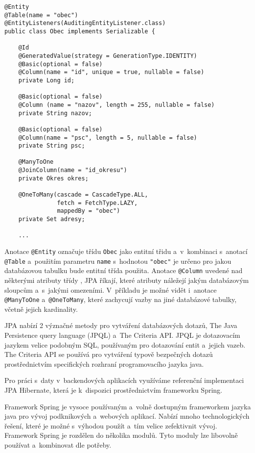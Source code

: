 \documentclass[12pt]{article}
\begin{document}
{\begin{lstlisting}
@Entity
@Table(name = "obec")
@EntityListeners(AuditingEntityListener.class)
public class Obec implements Serializable {

    @Id
    @GeneratedValue(strategy = GenerationType.IDENTITY)
    @Basic(optional = false)
    @Column(name = "id", unique = true, nullable = false)
    private Long id;
    
    @Basic(optional = false)
    @Column (name = "nazov", length = 255, nullable = false)
    private String nazov;
     
    @Basic(optional = false) 
    @Column(name = "psc", length = 5, nullable = false)
    private String psc; 
    
    @ManyToOne
    @JoinColumn(name = "id_okresu")  
    private Okres okres; 
    
    @OneToMany(cascade = CascadeType.ALL,
               fetch = FetchType.LAZY,
               mappedBy = "obec")   
    private Set adresy;
    
    ...

\end{lstlisting}

Anotace \texttt{@Entity} označuje třídu \texttt{Obec}
jako entitní třidu a~v~kombinaci s~anotací \texttt{@Table} 
a~použitím parametru \texttt{name} s~hodnotou \texttt{"obec"}
je určeno pro jakou databázovou tabulku bude entitní třída použita.
Anotace \texttt{@Column} uvedené nad některými atributy třídy ,
JPA říkají, které atributy náležejí jakým databázovým sloupcům a~s~jakými omezeními.
V~příkladu je možné vidět i~anotace \texttt{@ManyToOne} a~\texttt{@OneToMany},
které zachycují vazby na jiné databázové tabulky, včetně jejich kardinality.

JPA nabízí 2 význačné metody pro vytváření databázových dotazů, 
The Java Persistence query language (JPQL) a~The Criteria API.
JPQL je dotazovacím jazykem velice podobným SQL, používaným pro dotazování
entit a~jejich vazeb.
The Criteria API se používá pro vytváření typově bezpečných dotazů
prostřednictvím specifických rozhraní programovacího jazyka java.
\cite{oracleJPA}

Pro práci s~daty v~backendových aplikacích využíváme referenční implementaci 
JPA Hibernate, která je k~dispozici prostřednictvím frameworku Spring.


Framework Spring je vysoce používaným a~volně dostupným frameworkem
jazyka java pro vývoj podknikových a~webových aplikací.
Nabízí mnoho technologických řešení, které je možné s~výhodou
použít a~tím velice zefektivnit vývoj.
Framework Spring je rozdělen do několika modulů.
Tyto moduly lze libovolně používat a~kombinovat dle potřeby.

}
\end{document}
